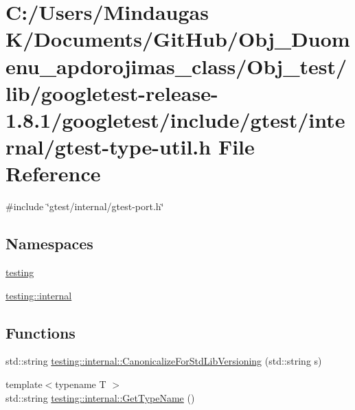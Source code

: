 \hypertarget{_obj__test_2lib_2googletest-release-1_88_81_2googletest_2include_2gtest_2internal_2gtest-type-util_8h}{}\section{C\+:/\+Users/\+Mindaugas K/\+Documents/\+Git\+Hub/\+Obj\+\_\+\+Duomenu\+\_\+apdorojimas\+\_\+class/\+Obj\+\_\+test/lib/googletest-\/release-\/1.8.1/googletest/include/gtest/internal/gtest-\/type-\/util.h File Reference}
\label{_obj__test_2lib_2googletest-release-1_88_81_2googletest_2include_2gtest_2internal_2gtest-type-util_8h}
{\ttfamily \#include \char`\"{}gtest/internal/gtest-\/port.\+h\char`\"{}}\newline
\subsection*{Namespaces}
\begin{DoxyCompactItemize}
\item 
 \mbox{\hyperlink{namespacetesting}{testing}}
\item 
 \mbox{\hyperlink{namespacetesting_1_1internal}{testing\+::internal}}
\end{DoxyCompactItemize}
\subsection*{Functions}
\begin{DoxyCompactItemize}
\item 
std\+::string \mbox{\hyperlink{namespacetesting_1_1internal_a5342e843f087081705094beae07b557b}{testing\+::internal\+::\+Canonicalize\+For\+Std\+Lib\+Versioning}} (std\+::string s)
\item 
{\footnotesize template$<$typename T $>$ }\\std\+::string \mbox{\hyperlink{namespacetesting_1_1internal_a635606b4731f843c86ec8ca51cab83a1}{testing\+::internal\+::\+Get\+Type\+Name}} ()
\end{DoxyCompactItemize}
